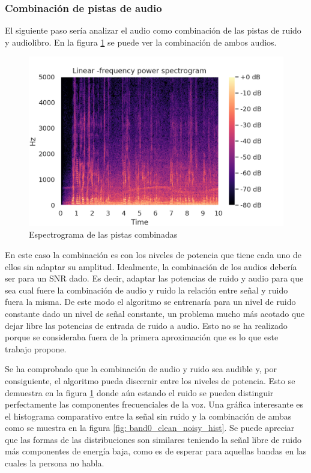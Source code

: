 \subsubsection{Combinación de pistas de audio}
El siguiente paso sería analizar el audio como combinación de las pistas de ruido y audiolibro. En la figura \ref{fig: combination_spectral} se puede ver la combinación de ambos audios.

\begin{figure}[h!]
	\centering
	\includegraphics[width=0.9\columnwidth]{figures/combination_spectrogram.png}
	\caption{Espectrograma de las pistas combinadas}
	\label{fig: combination_spectral}
\end{figure}

En este caso la combinación es con los niveles de potencia que tiene cada uno de ellos sin adaptar su amplitud. Idealmente, la combinación de los audios debería ser para un \gls{SNR} dado. Es decir, adaptar las potencias de ruido y audio para que sea cual fuere la combinación de audio y ruido la relación entre señal y ruido fuera la misma. De este modo el algoritmo se entrenaría para un nivel de ruido constante dado un nivel de señal constante, un problema mucho más acotado que dejar libre las potencias de entrada de ruido a audio. Esto no se ha realizado porque se consideraba fuera de la primera aproximación que es lo que este trabajo propone.

Se ha comprobado que la combinación de audio y ruido sea audible y, por consiguiente, el algoritmo pueda discernir entre los niveles de potencia. Esto se demuestra en la figura \ref{fig: combination_spectral} donde aún estando el ruido se pueden distinguir perfectamente las componentes frecuenciales de la voz. Una gráfica interesante es el histograma comparativo entre la señal sin ruido y la combinación de ambas como se muestra en la figura \ref{fig: band0_clean_noisy_hist}. Se puede apreciar que las formas de las distribuciones son similares teniendo la señal libre de ruido más componentes de energía baja, como es de esperar para aquellas bandas en las cuales la persona no habla.

